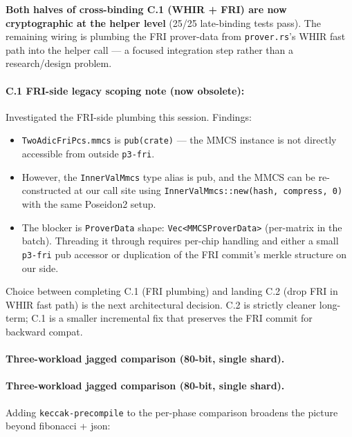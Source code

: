 \textbf{Both halves of cross-binding C.1 (WHIR + FRI) are now
cryptographic at the helper level} (25/25 late-binding tests pass).
The remaining wiring is plumbing the FRI prover-data from
\texttt{prover.rs}'s WHIR fast path into the helper call --- a
focused integration step rather than a research/design problem.

\paragraph{C.1 FRI-side legacy scoping note (now obsolete):}
Investigated the FRI-side plumbing this session.  Findings:
\begin{itemize}
  \item \texttt{TwoAdicFriPcs.mmcs} is \texttt{pub(crate)} --- the
        MMCS instance is not directly accessible from outside
        \texttt{p3-fri}.
  \item However, the \texttt{InnerValMmcs} type alias is pub, and
        the MMCS can be re-constructed at our call site using
        \texttt{InnerValMmcs::new(hash, compress, 0)} with the same
        Poseidon2 setup.
  \item The blocker is \texttt{ProverData} shape:
        \texttt{Vec<MMCSProverData>} (per-matrix in the batch).
        Threading it through requires per-chip handling and either
        a small \texttt{p3-fri} pub accessor or duplication of the
        FRI commit's merkle structure on our side.
\end{itemize}
Choice between completing C.1 (FRI plumbing) and landing C.2 (drop
FRI in WHIR fast path) is the next architectural decision.  C.2 is
strictly cleaner long-term; C.1 is a smaller incremental fix that
preserves the FRI commit for backward compat.

\paragraph{Three-workload jagged comparison (80-bit, single shard).}

\paragraph{Three-workload jagged comparison (80-bit, single shard).}
Adding \texttt{keccak-precompile} to the per-phase comparison
broadens the picture beyond fibonacci + json:

